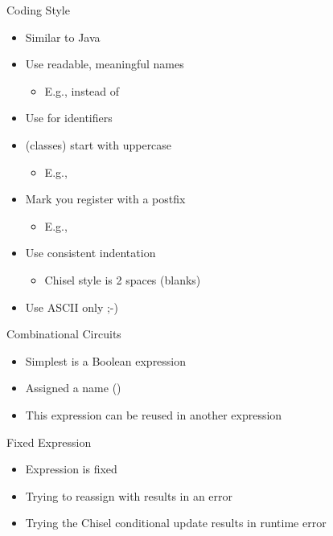 \begin{frame}[fragile]{Coding Style}
\begin{itemize}
\item Similar to Java
\item Use readable, meaningful names
\begin{itemize}
\item E.g.,  instead of 
\end{itemize}
\item Use  for identifiers
\item {} (classes) start with uppercase
\begin{itemize}
\item E.g., 
\end{itemize}
\item Mark you register with a postfix 
\begin{itemize}
\item E.g., 
\end{itemize}
\item Use consistent indentation
\begin{itemize}
\item Chisel style is 2 spaces (blanks)
\end{itemize}
\item Use ASCII only ;-)
\end{itemize}
\end{frame}

\begin{frame}[fragile]{Combinational Circuits}
\begin{itemize}
\item Simplest is a Boolean expression
\item Assigned a name ()
\item This expression can be reused in another expression
\end{itemize}
\end{frame}

\begin{frame}[fragile]{Fixed Expression}
\begin{itemize}
\item Expression is fixed
\item Trying to reassign with \code{=} results in an error
\item Trying the Chisel conditional update \code{:=} results in runtime error
\end{itemize}
\end{frame}

